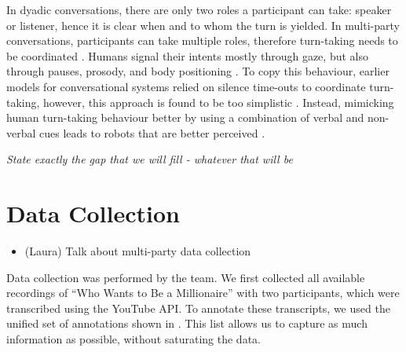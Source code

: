 \documentclass[hidelinks, 11pt]{article}
\begin{document}
In dyadic conversations, there are only two roles a participant can take: speaker or listener, hence it is clear when and to whom the turn is yielded. In multi-party conversations, participants can take multiple roles, therefore turn-taking needs to be coordinated \cite{Johansson_Skantze_2015}. Humans signal their intents mostly through gaze, but also through pauses, prosody, and body positioning \cite{Żarkowski_2019}. To copy this behaviour, earlier models for conversational systems relied on silence time-outs to coordinate turn-taking, however, this approach is found to be too simplistic \cite{skantze_turn_taking_2021}. Instead, mimicking human turn-taking behaviour better by using a combination of verbal and non-verbal cues leads to robots that are better perceived \cite{moujahid_multi_party_2022}.

\textit{State exactly the gap that we will fill - whatever that will be}


\section{Data Collection}
\label{sec:data_collection}

\begin{itemize}
  \item (Laura) Talk about multi-party data collection
\end{itemize}

Data collection was performed by the team. We first collected all available recordings of ``Who Wants to Be a Millionaire'' with two participants, which were transcribed using the YouTube API. To annotate these transcripts, we used the unified set of annotations shown in . This list allows us to capture as much information as possible, without saturating the data.
\end{document}
